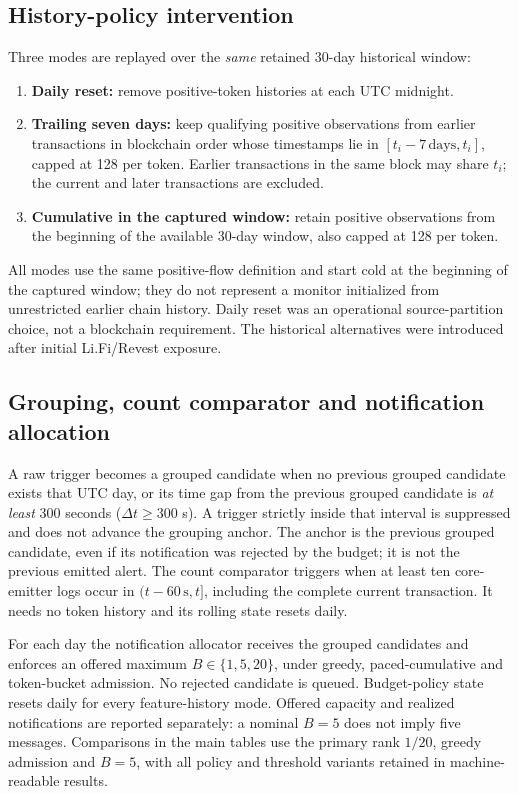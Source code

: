 \documentclass[preprint,12pt,authoryear]{elsarticle}
\begin{document}
\subsection{History-policy intervention}
Three modes are replayed over the \emph{same} retained 30-day historical window:
\begin{enumerate}
\item \textbf{Daily reset:} remove positive-token histories at each UTC midnight.
\item \textbf{Trailing seven days:} keep qualifying positive observations from earlier transactions in blockchain order whose timestamps lie in $[t_i-7\,\mathrm{days},t_i]$, capped at 128 per token. Earlier transactions in the same block may share $t_i$; the current and later transactions are excluded.
\item \textbf{Cumulative in the captured window:} retain positive observations from the beginning of the available 30-day window, also capped at 128 per token.
\end{enumerate}
All modes use the same positive-flow definition and start cold at the beginning of the captured window; they do not represent a monitor initialized from unrestricted earlier chain history. Daily reset was an operational source-partition choice, not a blockchain requirement. The historical alternatives were introduced after initial Li.Fi/Revest exposure.

\subsection{Grouping, count comparator and notification allocation}
A raw trigger becomes a grouped candidate when no previous grouped candidate exists that UTC day, or its time gap from the previous grouped candidate is \emph{at least} 300 seconds ($\Delta t\geq300$ s). A trigger strictly inside that interval is suppressed and does not advance the grouping anchor. The anchor is the previous grouped candidate, even if its notification was rejected by the budget; it is not the previous emitted alert. The count comparator triggers when at least ten core-emitter logs occur in $(t-60\,\mathrm{s},t]$, including the complete current transaction. It needs no token history and its rolling state resets daily.

For each day the notification allocator receives the grouped candidates and enforces an offered maximum $B\in\{1,5,20\}$, under greedy, paced-cumulative and token-bucket admission. No rejected candidate is queued. Budget-policy state resets daily for every feature-history mode. Offered capacity and realized notifications are reported separately: a nominal $B=5$ does not imply five messages. Comparisons in the main tables use the primary rank $1/20$, greedy admission and $B=5$, with all policy and threshold variants retained in machine-readable results.
\end{document}
